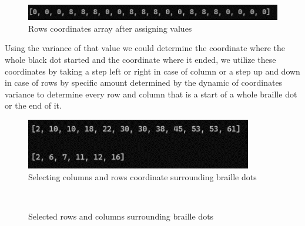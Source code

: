 \clearpage
\begin{figure}[!ht]
\centering
\includegraphics[width=1\linewidth]{6.1.3.png}
\caption{Rows coordinates array after assigning values}
\label{fig:rows coordinates array after assigning values}
\end{figure} 
Using the variance of that value we could determine the coordinate where the whole black dot started and the coordinate where it ended, we utilize these coordinates by taking a step left or right in case of column or a step up and down in case of rows by specific amount determined by the dynamic of coordinates variance to determine every row and column that is a start of a whole braille dot or the end of it.
\begin{figure}[!ht]
\centering
\includegraphics[width=0.7\linewidth]{6.1.4.png}
\caption{Selecting columns and rows coordinate surrounding braille dots}
\label{fig:selecting columns and rows coordinate surrounding braille dots}
\end{figure} 
\begin{figure}[!ht]
    \centering
    \hfill
    \\
    \caption{Selected rows and columns surrounding braille dots}
    \label{fig:Selected rows and columns surrounding braille dots}
\end{figure}

